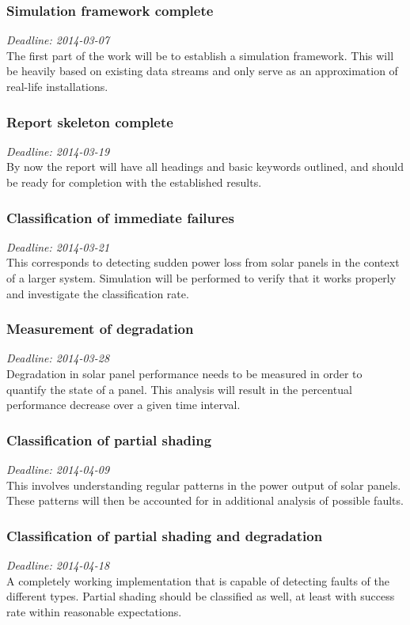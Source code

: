 \documentclass[a4paper,11pt]{article}
\begin{document}
\subsubsection*{Simulation framework complete}
\noindent
\emph{Deadline: 2014-03-07}\\
\noindent
The first part of the work will be to establish a simulation framework.
This will be heavily based on existing data streams and only serve as an approximation of real-life installations.

\subsubsection*{Report skeleton complete}
\noindent
\emph{Deadline: 2014-03-19}\\
\noindent
By now the report will have all headings and basic keywords outlined, and should be ready for completion with the established results.

\subsubsection*{Classification of immediate failures}
\noindent
\emph{Deadline: 2014-03-21}\\
\noindent
This corresponds to detecting sudden power loss from solar panels in the context of a larger system.
Simulation will be performed to verify that it works properly and investigate the classification rate.

\subsubsection*{Measurement of degradation}
\noindent
\emph{Deadline: 2014-03-28}\\
\noindent
Degradation in solar panel performance needs to be measured in order to quantify the state of a panel.
This analysis will result in the percentual performance decrease over a given time interval.

\subsubsection*{Classification of partial shading}
\noindent
\emph{Deadline: 2014-04-09}\\
\noindent
This involves understanding regular patterns in the power output of solar panels.
These patterns will then be accounted for in additional analysis of possible faults.

\subsubsection*{Classification of partial shading and degradation}
\noindent
\emph{Deadline: 2014-04-18}\\
\noindent
A completely working implementation that is capable of detecting faults of the different types.
Partial shading should be classified as well, at least with success rate within reasonable expectations.
\end{document}
